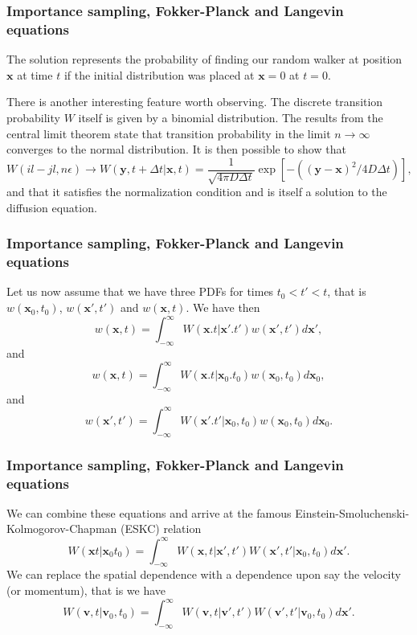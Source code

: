 \documentclass{beamer}
\begin{document}
\begin{frame}
\frametitle{Importance sampling, Fokker-Planck and Langevin equations}

The solution represents the probability of finding
our random walker at position $\mathbf{x}$ at time $t$ if the initial distribution 
was placed at $\mathbf{x}=0$ at $t=0$. 

There is another interesting feature worth observing. The discrete transition probability $W$
itself is given by a binomial distribution.
The results from the central limit theorem state that 
transition probability in the limit $n\rightarrow \infty$ converges to the normal 
distribution. It is then possible to show that
\[
    W(il-jl,n\epsilon)\rightarrow W(\mathbf{y},t+\Delta t|\mathbf{x},t)=
    \frac{1}{\sqrt{4\pi D\Delta t}}\exp{\left[-((\mathbf{y}-\mathbf{x})^2/4D\Delta t)\right]},
\]
and that it satisfies the normalization condition and is itself a solution
to the diffusion equation.
\end{frame}

\begin{frame}
\frametitle{Importance sampling, Fokker-Planck and Langevin equations}

Let us now assume that we have three PDFs for times $t_0 < t' < t$, that is
$w(\mathbf{x}_0,t_0)$, $w(\mathbf{x}',t')$ and $w(\mathbf{x},t)$.
We have then  
\[
   w(\mathbf{x},t)= \int_{-\infty}^{\infty} W(\mathbf{x}.t|\mathbf{x}'.t')w(\mathbf{x}',t')d\mathbf{x}',
\]
and
\[
   w(\mathbf{x},t)= \int_{-\infty}^{\infty} W(\mathbf{x}.t|\mathbf{x}_0.t_0)w(\mathbf{x}_0,t_0)d\mathbf{x}_0,
\]
and
\[
   w(\mathbf{x}',t')= \int_{-\infty}^{\infty} W(\mathbf{x}'.t'|\mathbf{x}_0,t_0)w(\mathbf{x}_0,t_0)d\mathbf{x}_0.
\]
\end{frame}

\begin{frame}
\frametitle{Importance sampling, Fokker-Planck and Langevin equations}

We can combine these equations and arrive at the famous Einstein-Smoluchenski-Kolmogorov-Chapman (ESKC) relation
\[
 W(\mathbf{x}t|\mathbf{x}_0t_0)  = \int_{-\infty}^{\infty} W(\mathbf{x},t|\mathbf{x}',t')W(\mathbf{x}',t'|\mathbf{x}_0,t_0)d\mathbf{x}'.
\]
We can replace the spatial dependence with a dependence upon say the velocity
(or momentum), that is we have
\[
 W(\mathbf{v},t|\mathbf{v}_0,t_0)  = \int_{-\infty}^{\infty} W(\mathbf{v},t|\mathbf{v}',t')W(\mathbf{v}',t'|\mathbf{v}_0,t_0)d\mathbf{x}'.
\]
\end{frame}
\end{document}
